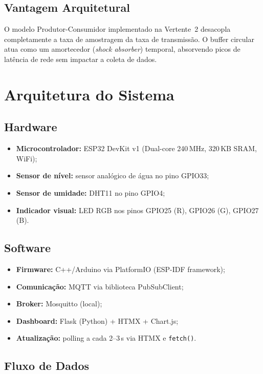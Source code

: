 \documentclass[12pt, a4paper]{article}
\begin{document}
\subsection{Vantagem Arquitetural}

O modelo Produtor-Consumidor implementado na Vertente~2 desacopla completamente a taxa de amostragem da taxa de transmissão. O buffer circular atua como um amortecedor (\textit{shock absorber}) temporal, absorvendo picos de latência de rede sem impactar a coleta de dados.

\section{Arquitetura do Sistema}

\subsection{Hardware}
\begin{itemize}
    \item \textbf{Microcontrolador:} ESP32 DevKit v1 (Dual-core 240\,MHz, 320\,KB SRAM, WiFi);
    \item \textbf{Sensor de nível:} sensor analógico de água no pino GPIO33;
    \item \textbf{Sensor de umidade:} DHT11 no pino GPIO4;
    \item \textbf{Indicador visual:} LED RGB nos pinos GPIO25 (R), GPIO26 (G), GPIO27 (B).
\end{itemize}

\subsection{Software}
\begin{itemize}
    \item \textbf{Firmware:} C++/Arduino via PlatformIO (ESP-IDF framework);
    \item \textbf{Comunicação:} MQTT via biblioteca PubSubClient;
    \item \textbf{Broker:} Mosquitto (local);
    \item \textbf{Dashboard:} Flask (Python) + HTMX + Chart.js;
    \item \textbf{Atualização:} polling a cada 2--3\,s via HTMX e \texttt{fetch()}.
\end{itemize}

\subsection{Fluxo de Dados}
\end{document}
